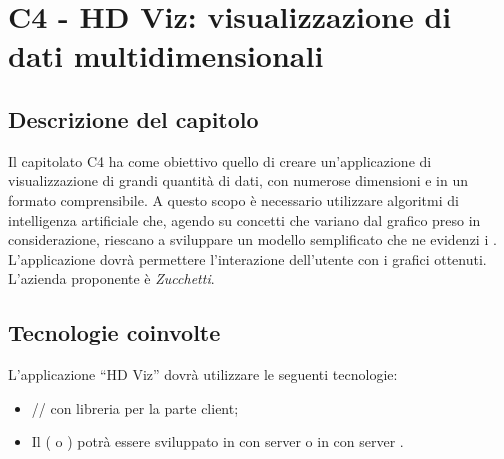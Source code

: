 \section{C4 - HD Viz: visualizzazione di dati multidimensionali}

\subsection{Descrizione del capitolo}
Il capitolato C4 ha come obiettivo quello di creare un'applicazione di visualizzazione di grandi quantità di dati, con numerose dimensioni e in un formato comprensibile. A questo scopo è necessario utilizzare algoritmi di intelligenza artificiale che, agendo su concetti che variano dal grafico preso in considerazione, riescano a sviluppare un modello semplificato che ne evidenzi i . 
L'applicazione dovrà permettere l'interazione dell'utente con i grafici ottenuti.\\
L'azienda proponente è \textit{Zucchetti}.

\subsection{Tecnologie coinvolte}
L'applicazione “HD Viz” dovrà utilizzare le seguenti tecnologie:
\begin{itemize}
\item {}// con libreria  per la parte client;
\item Il  ( o ) potrà essere sviluppato in  con server  o in  con server .
\end{itemize}

